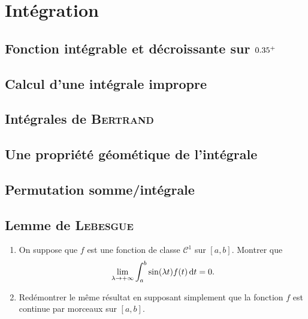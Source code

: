 \chapter{Intégration}

\section{Fonction intégrable et décroissante sur \texorpdfstring{$0.35^+$}{R+}}


\section{Calcul d'une intégrale impropre}


\section{Intégrales de  \textsc{Bertrand}}


\section{Une propriété géométique de l'intégrale}


\section{Permutation somme/intégrale}


\section{Lemme de \textsc{Lebesgue}}

\begin{exercice}
    \begin{enumerate}
        \item On suppose que $f$ est une fonction de classe $\mathscr{C}^1$ sur $[a, b]$. Montrer que
        $$\lim_{ \lambda \to +\infty} \int_a^b \sin(\lambda t) f(t) \, \mathrm{d} t = 0.$$
        \item Redémontrer le même résultat en supposant simplement que la fonction $f$ est continue par morceaux sur $[a, b]$.
    \end{enumerate}
\end{exercice}

